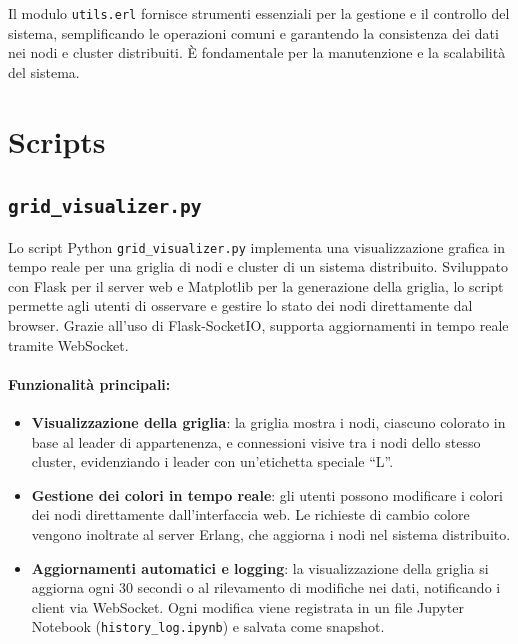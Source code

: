 \documentclass[12pt, a4paper]{report}
\begin{document}
\noindent
Il modulo \texttt{utils.erl} fornisce strumenti essenziali per la gestione e il controllo del sistema, semplificando le operazioni comuni e garantendo la consistenza dei dati nei nodi e cluster distribuiti. È fondamentale per la manutenzione e la scalabilità del sistema.

\section{Scripts}\label{sec:scripts}

\subsection{\texttt{grid\_visualizer.py}}

Lo script Python \texttt{grid\_visualizer.py} implementa una visualizzazione grafica in tempo reale per una griglia di nodi e cluster di un sistema distribuito. Sviluppato con Flask per il server web e Matplotlib per la generazione della griglia, lo script permette agli utenti di osservare e gestire lo stato dei nodi direttamente dal browser. Grazie all'uso di Flask-SocketIO, supporta aggiornamenti in tempo reale tramite WebSocket.

\paragraph{Funzionalità principali:}
\begin{itemize}
    \item \textbf{Visualizzazione della griglia}: la griglia mostra i nodi, ciascuno colorato in base al leader di appartenenza, e connessioni visive tra i nodi dello stesso cluster, evidenziando i leader con un'etichetta speciale ``L''.
    \item \textbf{Gestione dei colori in tempo reale}: gli utenti possono modificare i colori dei nodi direttamente dall'interfaccia web. Le richieste di cambio colore vengono inoltrate al server Erlang, che aggiorna i nodi nel sistema distribuito.
    \item \textbf{Aggiornamenti automatici e logging}: la visualizzazione della griglia si aggiorna ogni 30 secondi o al rilevamento di modifiche nei dati, notificando i client via WebSocket. Ogni modifica viene registrata in un file Jupyter Notebook (\texttt{history\_log.ipynb}) e salvata come snapshot.
\end{itemize}
\end{document}
